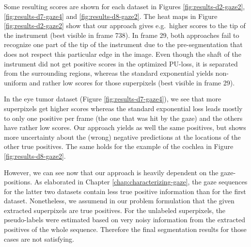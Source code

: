 Some resulting scores are shown for each dataset in Figures \ref{fig:results-d2-gaze2}, \ref{fig:results-d7-gaze4} and \ref{fig:results-d8-gaze2}. 
The heat maps in Figure \ref{fig:results-d2-gaze2} show that our approach gives e.g.\ higher scores to the tip of the instrument (best visible in frame 738). 
In frame 29, both approaches fail to recognize one part of the tip of the instrument due to the pre-segmentation that does not respect this particular edge in the image. Even though the shaft of the instrument did not get positive scores in the optimized PU-loss, it is separated from the surrounding regions, whereas the standard exponential yields non-uniform and rather low scores for those superpixels (best visible in frame 29).

In the eye tumor dataset (Figure \ref{fig:results-d7-gaze4}), we see that more superpixels get higher scores whereas the standard exponential loss leads mostly to only one positive per frame (the one that was hit by the gaze) and the others have rather low scores. 
Our approach yields as well the same positives, but shows more uncertainty about the (wrong) negative predictions at the locations of the other true positives. 
The same holds for the example of the cochlea in Figure \ref{fig:results-d8-gaze2}. 

However, we can see now that our approach is heavily dependent on the gaze-positions. As elaborated in Chapter \ref{chap:characterizing-gaze}, the gaze sequences for the latter two datasets contain less true positive information than for the first dataset. Nonetheless, we assumend in our problem formulation that the given extracted superpixels are true positives. For the unlabeled superpixels, the pseudo-labels were estimated based on very noisy information from the extracted positives of the whole sequence. Therefore the final segmentation results for those cases are not satisfying.

